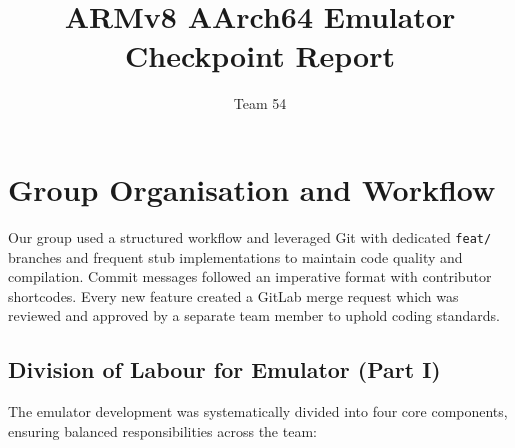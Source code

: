 \documentclass[11pt,a4paper]{article} %
\begin{document}
\title{ARMv8 AArch64 Emulator Checkpoint Report}
\author{Team 54}

\maketitle

\section{Group Organisation and Workflow}
\label{sec:group-organisation}

Our group used a structured workflow and leveraged Git with dedicated \texttt{feat/} branches and frequent stub implementations to maintain code quality and compilation. Commit messages followed an imperative format with contributor shortcodes. Every new feature created a GitLab merge request which was reviewed and approved by a separate team member to uphold coding standards.

\subsection{Division of Labour for Emulator (Part I)}
The emulator development was systematically divided into four core components, ensuring balanced responsibilities across the team:
\end{document}
